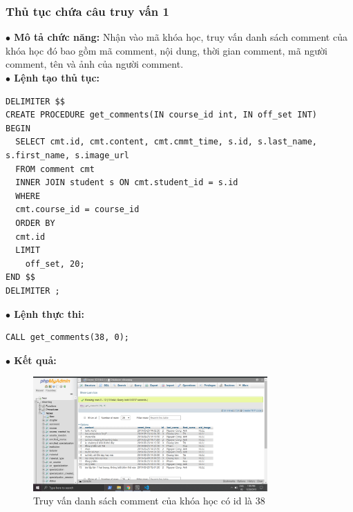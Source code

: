\documentclass[12pt,a4paper,titlepage]{article}
\begin{document}
\subsubsection{Thủ tục chứa câu truy vấn 1}
\textbf{$\bullet$ Mô tả chức năng:} Nhận vào mã khóa học, truy vấn danh sách comment của khóa học đó bao gồm mã comment, nội dung, thời gian comment, mã người comment, tên và ảnh của người comment.\\
\textbf{$\bullet$ Lệnh tạo thủ tục:}
\begin{lstlisting}
DELIMITER $$
CREATE PROCEDURE get_comments(IN course_id int, IN off_set INT) 
BEGIN
  SELECT cmt.id, cmt.content, cmt.cmmt_time, s.id, s.last_name, s.first_name, s.image_url
  FROM comment cmt
  INNER JOIN student s ON cmt.student_id = s.id
  WHERE 
  cmt.course_id = course_id
  ORDER BY
  cmt.id
  LIMIT
    off_set, 20;
END $$
DELIMITER ;
\end{lstlisting}
\textbf{$\bullet$ Lệnh thực thi:}
\begin{lstlisting}
CALL get_comments(38, 0);
\end{lstlisting}
\textbf{$\bullet$ Kết quả:}
\begin{figure}[h!]
	\centering
	\caption{Truy vấn danh sách comment của khóa học có id là 38}
	\includegraphics[width=0.8\textwidth]{images/cmmt5.png}
\end{figure}
\end{document}
